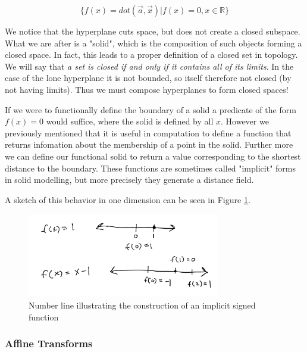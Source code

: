 \begin{equation}
\{f(x)=dot(\vec{a},\vec{x})|f(x)=0,x \in \mathbb{R}\}
\end{equation}

We notice that the hyperplane cuts space, but does not create a closed
subspace. What we are after is a "solid", which is the composition of
such objects forming a closed space. In fact, this leads to a proper definition
of a closed set in topology. We will say that \emph{a set is closed if and only if it
contains all of its limits}\cite{007054235X}. In the case of the lone hyperplane
it is not bounded, so itself therefore not closed (by not having limits). Thus
we must compose hyperplanes to form closed spaces!



If we were to functionally define the boundary of a solid a predicate of the
form $f(x) = 0$ would suffice, where the solid is defined by all $x$.
However we previously mentioned that it is
useful in computation to define a function that returns infomation about
the membership of a point in the solid. Further more we can define our functional
solid to return a value corresponding to the shortest distance to the boundary.\cite{Olah_2011}
These functions are sometimes called "implicit" forms in solid modelling, but
more precisely they generate a distance field.

A sketch of this behavior in one dimension
can be seen in Figure \ref{fig:implicit-sketch}.

\begin{figure}[h!]
  \centering
    \includegraphics[width=0.75\textwidth]{img/implicit_sketch.png}
  \caption{Number line illustrating the construction of an implicit signed function}
  \label{fig:implicit-sketch}
\end{figure}

\subsubsection{Affine Transforms}

